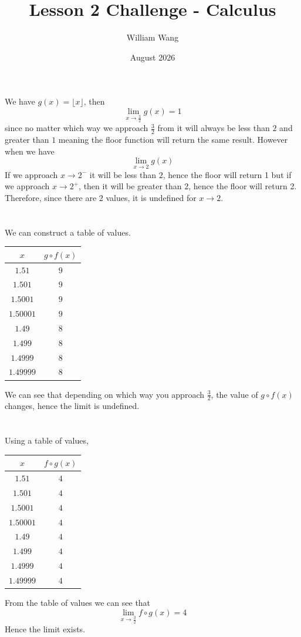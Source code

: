 \documentclass{article}
\title{Lesson 2 Challenge - Calculus}
\author{William Wang}
\date{August 2026}
\begin{document}
\maketitle

\section{}
We have \(g(x) = \lfloor x \rfloor\), then 
\[\lim_{x\to\frac{3}{2}} g(x) = 1\]
since no matter which way we approach \(\frac{3}{2}\) from it will always be less than \(2\) and greater than \(1\) meaning the floor function will return the same result. However when we have 
\[\lim_{x\to2}g(x)\]
If we approach \(x \to 2^-\) it will be less than $2$, hence the floor will return 1 but if we approach \(x \to 2^+\), then it will be greater than 2, hence the floor will return 2. Therefore, since there are $2$ values, it is undefined for \(x \to 2\). 
\section{}
We can construct a table of values. 
\begin{table}[ht]
\centering
\begin{tabular}{cc}
\toprule
$x$ & $g \circ f(x)$\\
\midrule
$1.51$    & $9$ \\
$1.501$   & $9$ \\
$1.5001$  & $9$ \\
$1.50001$ & $9$ \\

$1.49$& $8$ \\
$1.499$   & $8$ \\
$1.4999$    & $8$ \\
$1.49999$     & $8$ \\
\bottomrule
\end{tabular}
\end{table}
We can see that depending on which way you approach \(\frac{3}{2}\), the value of \(g\circ f(x)\) changes, hence the limit is undefined. 
\section{}
Using a table of values,
\begin{table}[ht]
\centering
\begin{tabular}{cc}
\toprule
$x$ & $f \circ g(x)$\\
\midrule
$1.51$    & $4$ \\
$1.501$   & $4$ \\
$1.5001$  & $4$ \\
$1.50001$ & $4$ \\

$1.49$& $4$ \\
$1.499$   & $4$ \\
$1.4999$    & $4$ \\
$1.49999$     & $4$ \\
\bottomrule
\end{tabular}
\end{table}
From the table of values we can see that 
\[\lim_{x\to \frac{3}{2}} f\circ g(x) = 4\] Hence the limit exists. 
\end{document}
